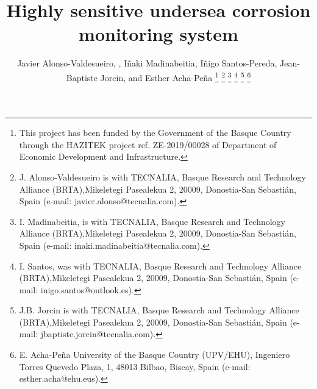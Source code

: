 \documentclass[journal,twoside,web]{ieeecolor}
\begin{document}
\title{Highly sensitive undersea corrosion monitoring system}
\author{Javier Alonso-Valdesueiro, , I\~naki Madinabeitia, I\~nigo Santos-Pereda, Jean-Baptiste Jorcin, and Esther Acha-Pe\~na
\thanks{This project  has  been funded by the Government of the Basque Country through the HAZITEK project ref. ZE-2019/00028 of Department of Economic Development and Infrastructure.}
\thanks{J. Alonso-Valdesueiro is with TECNALIA, Basque Research and Technology Alliance (BRTA),Mikeletegi Pasealekua 2, 20009, Donostia-San Sebastián, Spain (e-mail: javier.alonso@tecnalia.com). }
\thanks{I. Madinabeitia, is with TECNALIA, Basque Research and Technology Alliance (BRTA),Mikeletegi Pasealekua 2, 20009, Donostia-San Sebastián, Spain (e-mail: inaki.madinabeitia@tecnalia.com).}
\thanks{I. Santos, was with TECNALIA, Basque Research and Technology Alliance (BRTA),Mikeletegi Pasealekua 2, 20009, Donostia-San Sebastián, Spain (e-mail: inigo.santos@outlook.es).}
\thanks{J.B. Jorcin is with TECNALIA, Basque Research and Technology Alliance (BRTA),Mikeletegi Pasealekua 2, 20009, Donostia-San Sebastián, Spain (e-mail: jbaptiste.jorcin@tecnalia.com).}
\thanks{E. Acha-Pe\~na University of the Basque Country (UPV/EHU), Ingeniero Torres Quevedo Plaza, 1, 48013 Bilbao, Biscay, Spain (e-mail: esther.acha@ehu.eus).}}
\end{document}
